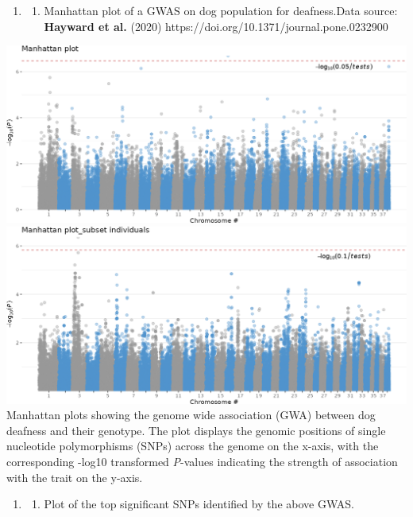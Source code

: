 \begin{enumerate}
  \def\labelenumi{\arabic{enumi}.}
  \setcounter{enumi}{1}
  \item
        \begin{enumerate}
          \def\labelenumii{\alph{enumii}.}
          \tightlist
          \item
                Manhattan plot of a GWAS on dog population for deafness.Data
                source: \textbf{Hayward et al.} (2020)
                https://doi.org/10.1371/journal.pone.0232900
        \end{enumerate}
\end{enumerate}

\includegraphics{Figures/manhattan_dogs.png?raw=true}
\includegraphics{Figures/manhattan_filter_acd.png?raw=true} Manhattan
plots showing the genome wide association (GWA) between dog deafness and
their genotype. The plot displays the genomic positions of single
nucleotide polymorphisms (SNPs) across the genome on the x-axis, with
the corresponding -log10 transformed \emph{P}-values indicating the
strength of association with the trait on the y-axis.

\begin{enumerate}
  \def\labelenumi{\arabic{enumi}.}
  \setcounter{enumi}{1}
  \item
        \begin{enumerate}
          \def\labelenumii{\alph{enumii}.}
          \setcounter{enumii}{1}
          \tightlist
          \item
                Plot of the top significant SNPs identified by the above GWAS.
        \end{enumerate}
\end{enumerate}

